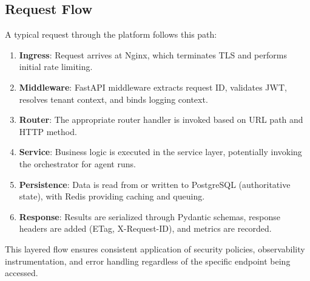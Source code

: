 \subsection{Request Flow}

A typical request through the platform follows this path:

\begin{enumerate}
    \item \textbf{Ingress}: Request arrives at Nginx, which terminates TLS and performs initial rate limiting.
    \item \textbf{Middleware}: FastAPI middleware extracts request ID, validates JWT, resolves tenant context, and binds logging context.
    \item \textbf{Router}: The appropriate router handler is invoked based on URL path and HTTP method.
    \item \textbf{Service}: Business logic is executed in the service layer, potentially invoking the orchestrator for agent runs.
    \item \textbf{Persistence}: Data is read from or written to PostgreSQL (authoritative state), with Redis providing caching and queuing.
    \item \textbf{Response}: Results are serialized through Pydantic schemas, response headers are added (ETag, X-Request-ID), and metrics are recorded.
\end{enumerate}

This layered flow ensures consistent application of security policies, observability instrumentation, and error handling regardless of the specific endpoint being accessed.
